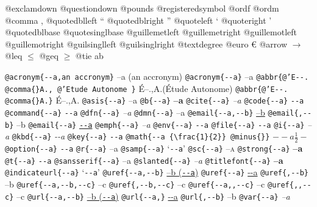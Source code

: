 \documentclass{book}
\begin{document}
@exclamdown \textexclamdown{}
@questiondown \textquestiondown{}
@pounds \textsterling{}
@registeredsymbol \circledR{}
@ordf \textordfeminine{}
@ordm \textordmasculine{}
@comma ,
@quotedblleft \textquotedblleft{}
@quotedblright \textquotedblright{}
@quoteleft \textquoteleft{}
@quoteright \textquoteright{}
@quotedblbase \quotedblbase{}
@quotesinglbase \quotesinglbase{}
@guillemetleft \guillemotleft{}
@guillemetright \guillemotright{}
@guillemotleft \guillemotleft{}
@guillemotright \guillemotright{}
@guilsinglleft \guilsinglleft{}
@guilsinglright \guilsinglright{}
@textdegree \textdegree{}
@euro \euro{}
@arrow $\rightarrow{}$
@leq $\leq{}$
@geq $\geq{}$
@tie a\hbox{}b

\texttt{@acronym\{{-}{-}a,an accronym\}} --a (an accronym)
\texttt{@acronym\{{-}{-}a\}} --a
\texttt{@abbr\{@'E{-}{-}. @comma\{\}A., @'Etude Autonome \}} \'{E}--.\@ ,A.\@ (\'{E}tude Autonome)
\texttt{@abbr\{@'E{-}{-}. @comma\{\}A.\}} \'{E}--.\@ ,A.\@
\texttt{@asis\{{-}{-}a\}} --a
\texttt{@b\{{-}{-}a\}} \textbf{--a}
\texttt{@cite\{{-}{-}a\}} \textit{--a}
\texttt{@code\{{-}{-}a\}} \texttt{{-}{-}a}
\texttt{@command\{{-}{-}a\}} \texttt{{-}{-}a}
\texttt{@dfn\{{-}{-}a\}} \emph{--a}
\texttt{@dmn\{{-}{-}a\}} --a
\texttt{@email\{{-}{-}a,{-}{-}b\}} \href{mailto:--a}{--b}
\texttt{@email\{,{-}{-}b\}} --b
\texttt{@email\{{-}{-}a\}} \href{mailto:--a}{\nolinkurl{--a}}
\texttt{@emph\{{-}{-}a\}} \emph{--a}
\texttt{@env\{{-}{-}a\}} \texttt{{-}{-}a}
\texttt{@file\{{-}{-}a\}} \texttt{{-}{-}a}
\texttt{@i\{{-}{-}a\}} \textit{--a}
\texttt{@kbd\{{-}{-}a\}} {\ttfamily\textsl{{-}{-}a}}
\texttt{@key\{{-}{-}a\}} \texttt{{-}{-}a}
\texttt{@math\{{-}{-}a \{\textbackslash{}frac\{1\}\{2\}\} @minus\{\}\}} $--a {\frac{1}{2}} -$
\texttt{@option\{{-}{-}a\}} \texttt{{-}{-}a}
\texttt{@r\{{-}{-}a\}} \textrm{--a}
\texttt{@samp\{{-}{-}a\}} `\texttt{{-}{-}a}'
\texttt{@sc\{{-}{-}a\}} \textsc{--a}
\texttt{@strong\{{-}{-}a\}} \textbf{--a}
\texttt{@t\{{-}{-}a\}} \texttt{{-}{-}a}
\texttt{@sansserif\{{-}{-}a\}} \textsf{--a}
\texttt{@slanted\{{-}{-}a\}} \textsl{--a}
\texttt{@titlefont\{{-}{-}a\}} {\huge \bfseries --a}
\texttt{@indicateurl\{{-}{-}a\}} `\texttt{{-}{-}a}'
\texttt{@uref\{{-}{-}a,{-}{-}b\}} \href{--a}{--b (\nolinkurl{--a})}
\texttt{@uref\{{-}{-}a\}} \url{--a}
\texttt{@uref\{,{-}{-}b\}} --b
\texttt{@uref\{{-}{-}a,{-}{-}b,{-}{-}c\}} --c
\texttt{@uref\{,{-}{-}b,{-}{-}c\}} --c
\texttt{@uref\{{-}{-}a,,{-}{-}c\}} --c
\texttt{@uref\{,,{-}{-}c\}} --c
\texttt{@url\{{-}{-}a,{-}{-}b\}} \href{--a}{--b (\nolinkurl{--a})}
\texttt{@url\{{-}{-}a,\}} \url{--a}
\texttt{@url\{,{-}{-}b\}} --b
\texttt{@var\{{-}{-}a\}} \emph{--a}
\end{document}
